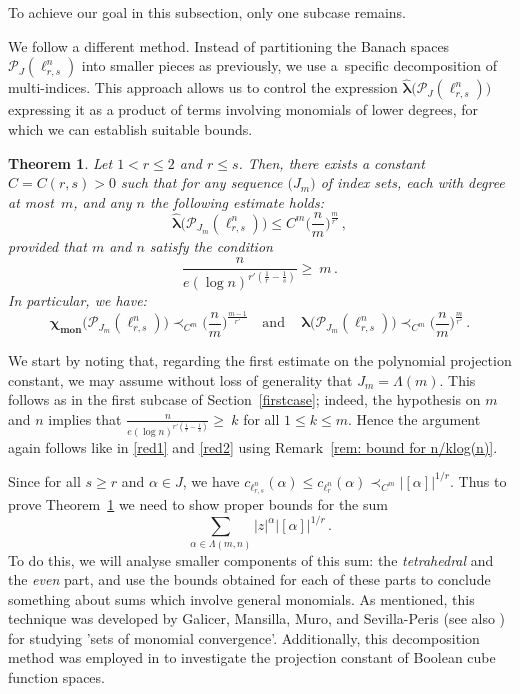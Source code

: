 \documentclass[12pt]{amsart}
\numberwithin{subsection}{section}
\newtheorem{theorem}{Theorem}[section]
\theoremstyle{definition}
\theoremstyle{remark}
\DeclareMathOperator{\mon}{mon}
\newcommand{\chimon}{\chi_{\mon}}
\begin{document}
To achieve our goal in this subsection, only one subcase remains.

 \label{secondcase}


 We follow a different method. Instead of partitioning the Banach
spaces $\mathcal P_J(\ell_{r,s}^n)$ into smaller pieces as previously, we use a~specific decomposition of multi-indices. This approach allows
us to control the expression $\widehat{\boldsymbol{\lambda}}\big(\mathcal{P}_J(\ell_{r,s}^n)\big)$ expressing it as a product of terms involving
monomials of lower degrees, for which we can establish suitable bounds.


\begin{theorem} \label{proj lorentz s>r}
Let $1 < r \leq 2$ and $r \leq s$. Then, there exists a constant $C=C(r, s)>0$ such that for any sequence $\big(J_m\big)$
of index sets, each with degree at most~$m$, and any $n$ the following estimate holds{\rm:}
\[
\widehat{\boldsymbol{\lambda}}\big(\mathcal P_{J_m}(\ell_{r,s}^n)\big) \le C^m \Big(\frac{n}{m} \Big)^{\frac{m}{r'}}\,,
\]
provided that $m$ and $n$ satisfy the condition
\[
\frac{n}{e(\log n)^{r'(\frac1{r}-\frac1{s})}}\ge~m\,.
\]
In particular, we have{\rm:}
\[
\boldsymbol{\chimon}\big(\mathcal P_{J_m}(\ell_{r,s}^n)\big) 
\prec_{C^m}   \Big(\frac{n}{m} \Big)^{\frac{m-1}{r'}} \quad \textrm{and}\quad\,
{\boldsymbol{\lambda}}\big(\mathcal P_{J_m}(\ell_{r,s}^n)\big)\prec_{C^m} \Big(\frac{n}{m} \Big)^{\frac{m}{r'}}\,.
\]
\end{theorem}


We start by noting that, regarding the first estimate on the polynomial projection constant, we may assume without loss of generality
that $J_m = \Lambda(m)$. This follows as in the first subcase of  Section~\ref{firstcase}; indeed, the hypothesis on $m$ and $n$ implies that
$\frac{n}{e(\log n)^{r'(\frac1{r}-\frac1{s})}}\ge~k$ for all $1 \leq k \leq m$. Hence the argument again follows
like in \eqref{red1} and \eqref{red2} using Remark~\ref{rem: bound for n/klog(n)}.

Since for all $s\geq r$ and $\alpha \in J$, we have $c_{\ell_{r,s}^n}(\alpha) \leq c_{\ell_{r}^n}(\alpha)
\prec_{C^m} |[\alpha]|^{1/r}$. Thus to prove Theorem~\ref{proj lorentz s>r} we need to show proper bounds for the sum
\begin{equation*} %
\sum_{\alpha \in \Lambda (m,n)} \vert z \vert^{\alpha} \vert [\alpha] \vert^{1/r}\,.
\end{equation*}
To do this, we will analyse smaller components of this sum: the \emph{tetrahedral} and the \emph{even} part, and use the bounds obtained for each of these parts to conclude something about sums which involve general monomials. As mentioned, this technique was developed by Galicer, Mansilla, Muro, and Sevilla-Peris \cite{galicer2021monomial} (see also \cite{mansilla2019thesis}) for studying 'sets of monomial convergence'. Additionally, this decomposition method was employed in \cite{defant2024asymptotic} to investigate the projection constant of Boolean cube function spaces.
\end{document}
